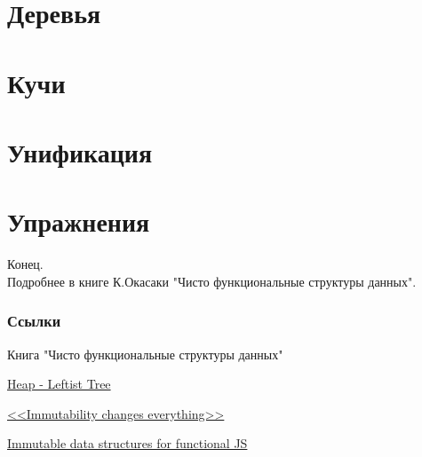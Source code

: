 \documentclass[aspectratio=169
  , xcolor={svgnames}
  , hyperref=
      { colorlinks
      , urlcolor=DarkBlue 
      }  
  , russian  %
  ]{beamer}
\theoremstyle{exerciseStyle1}
\begin{document}
\section{Деревья}



\section{Кучи}


\section{Унификация}


\section{Упражнения}



\begin{frame}
\begin{center}
  {\Huge Конец.}\\
  
  Подробнее в книге К.Окасаки "Чисто функциональные структуры данных".
\end{center}
\end{frame}


\begin{frame}[allowframebreaks]
\frametitle<presentation>{Ссылки}
\begin{thebibliography}{10}
  Книга "Чисто функциональные структуры данных"

  \href{http://typeocaml.com/2015/03/12/heap-leftist-tree/}{Heap - Leftist Tree}
  
  \href{https://doi.org/10.1145/2857274.2884038}{<<Immutability changes everything>>}
  
  \href{https://www.youtube.com/watch?v=Wo0qiGPSV-s}{Immutable data structures for functional JS}
  
\end{thebibliography}
\end{frame}
\end{document}

